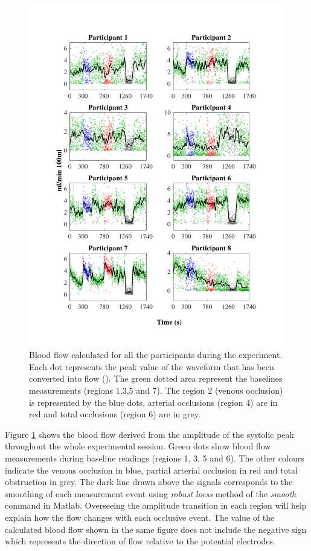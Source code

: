 \begin{figure}[!htbp]
	\centering
	\includegraphics[keepaspectratio,trim={1.5cm 0cm 1.5cm 0 cm},clip]{figure_apa_8}
	\caption[Blood flow calculated from impedance plethysmography waveform at the time of the whole expetiment]{Blood flow calculated for all the participants during the experiment. Each dot represents the peak value of the waveform that has been converted into flow (\si{\bfv}). The green dotted area represent the baselines measurements (regions 1,3,5 and 7). The region 2 (venous occlusion) is represented by the blue dots, arterial occlusions (region 4) are in red and total occlusions (region 6) are in grey.}
	\label{fig:blood_flow_plethysmography}
\end{figure}

Figure \ref{fig:blood_flow_plethysmography} shows the blood flow derived from the amplitude of the systolic peak throughout the whole experimental session. Green dots show blood flow measurements during baseline readings (regions 1, 3, 5 and 6). The other colours indicate the venous occlusion in blue, partial arterial occlusion in red and total obstruction in grey. The dark line drawn above the signals corresponds to the smoothing of each measurement event using \textit{robust loess} method of the \textit{smooth} command in Matlab. Overseeing the amplitude transition in each region will help explain how the flow changes with each occlusive event. The value of the calculated blood flow shown in the same figure does not include the negative sign which represents the direction of flow relative to the potential electrodes.

